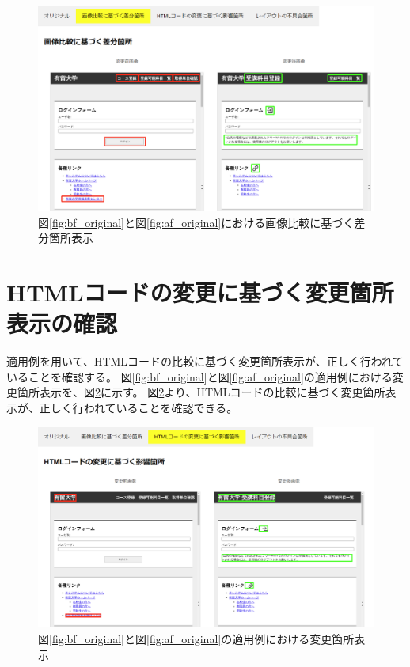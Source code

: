 \begin{figure}[tp]
    \begin{center}
        \includegraphics[width=1.0\columnwidth]{image/5/5_app2.png}
        \caption{図\ref{fig:bf_original}と図\ref{fig:af_original}における画像比較に基づく差分箇所表示}
        \label{fig: 5_app2}
    \end{center}
\end{figure}



\section{HTMLコードの変更に基づく変更箇所表示の確認}
適用例を用いて、HTMLコードの比較に基づく変更箇所表示が、正しく行われていることを確認する。
図\ref{fig:bf_original}と図\ref{fig:af_original}の適用例における変更箇所表示を、図\ref{fig: 5_app1}に示す。
図\ref{fig: 5_app1}より、HTMLコードの比較に基づく変更箇所表示が、正しく行われていることを確認できる。
\begin{figure}[tp]
    \begin{center}
        \includegraphics[width=1.0\columnwidth]{image/5/5_app1.png}
        \caption{図\ref{fig:bf_original}と図\ref{fig:af_original}の適用例における変更箇所表示}
        \label{fig: 5_app1}
    \end{center}
\end{figure}



